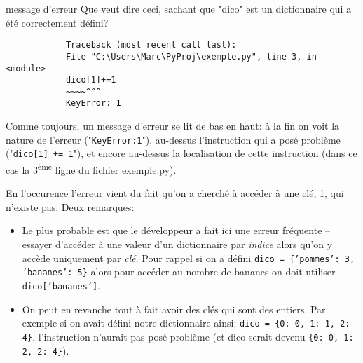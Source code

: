 \documentclass[12pt]{article}
\begin{document}
	\begin{MonQz}{message d'erreur}
		Que veut dire ceci, sachant que "dico" est un dictionnaire qui a été correctement défini?
		\begin{verbatim}
			Traceback (most recent call last):
			File "C:\Users\Marc\PyProj\exemple.py", line 3, in <module>
			dico[1]+=1
			~~~~^^^
			KeyError: 1
		\end{verbatim}
	\end{MonQz}
	\begin{MaReponse}
		Comme toujours, un message d'erreur se lit de bas en haut: à la fin on voit la nature de l'erreur ("\texttt{KeyError:1}"), au-dessus l'instruction qui a posé problème ("\texttt{dico[1] += 1}"), et encore au-dessus la localisation de cette instruction (dans ce cas la 3\textsuperscript{ème} ligne du fichier exemple.py).
		
		En l'occurence l'erreur vient du fait qu'on a cherché à accéder à une clé, 1, qui n'existe pas. Deux remarques:
		\begin{itemize}
			\item Le plus probable est que le développeur a fait ici une erreur fréquente -- essayer d'accéder à une valeur d'un dictionnaire par \textit{indice} alors qu'on y accède uniquement par \textit{clé}. Pour rappel si on a défini \texttt{dico = \{'pommes': 3, 'bananes': 5\}} alors pour accéder au nombre de bananes on doit utiliser \texttt{dico['bananes']}.
			\item On peut en revanche tout à fait avoir des clés qui sont des entiers. Par exemple si on avait défini notre dictionnaire ainsi: \texttt{dico = \{0: 0, 1: 1, 2: 4\}}, l'instruction n'aurait pas posé problème (et dico serait devenu \texttt{\{0: 0, 1: 2, 2: 4\}}).
		\end{itemize}
	\end{MaReponse}
\end{document}
